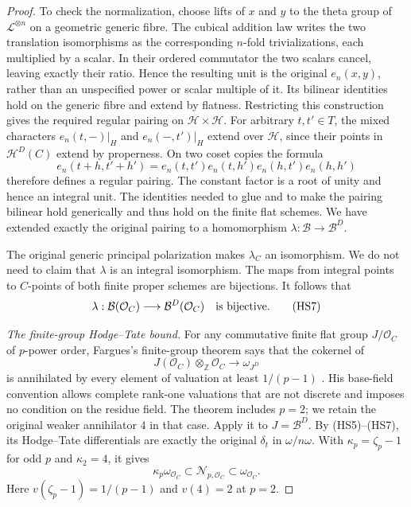 \begin{proof}
To check the normalization, choose lifts of $x$ and $y$ to the
theta group of $\mathcal L^{\otimes n}$ on a geometric generic
fibre. The cubical addition law writes the two translation
isomorphisms as the corresponding $n$-fold trivializations,
each multiplied by a scalar. In their ordered commutator the two
scalars cancel, leaving exactly their ratio. Hence the resulting
unit is the original $e_n(x,y)$, rather than an unspecified power
or scalar multiple of it. Its bilinear identities hold on the
generic fibre and extend by flatness. Restricting this construction
gives the required regular pairing on
$\mathcal H\times\mathcal H$\cite{hodge-specialization-source}.
For arbitrary $t,t'\in T$,
the mixed characters $e_n(t,-)|_H$ and $e_n(-,t')|_H$ extend over
$\mathcal H$, since their points in $\mathcal H^D(C)$ extend by
properness. On two coset copies the formula
\[
 e_n(t+h,t'+h')
   =e_n(t,t')e_n(t,h')e_n(h,t')e_n(h,h')
 \tag{HS6}
\]
therefore defines a regular pairing. The constant factor is a
root of unity and hence an integral unit. The identities needed
to glue and to make the pairing bilinear hold generically and
thus hold on the finite flat schemes. We have extended exactly
the original pairing to a homomorphism
$\lambda:\mathcal B\to\mathcal B^D$.

The original generic principal polarization makes $\lambda_C$
an isomorphism. We do not need to claim that $\lambda$ is an
integral isomorphism. The maps from integral points to $C$-points
of both finite proper schemes are bijections. It follows that
\[
 \lambda:\mathcal B(\mathcal O_C)
                       \longrightarrow\mathcal B^D(\mathcal O_C)
 \quad\hbox{is bijective}.
 \tag{HS7}
\]

\emph{The finite-group Hodge--Tate bound.}
For any commutative finite flat group $J/\mathcal O_C$ of $p$-power
order, Fargues's finite-group theorem says that the cokernel of
\[
 J(\mathcal O_C)\otimes_{\mathbb Z}\mathcal O_C
       \longrightarrow\omega_{J^D}
\]
is annihilated by every element of valuation at least $1/(p-1)$
\cite[\S5.4, Theorem~3]{hodge-fargues-finite}. His base-field
convention allows complete rank-one valuations that are not discrete
and imposes no condition on the residue field. The theorem includes
$p=2$; we retain the original weaker annihilator $4$ in that case.
Apply it to $J=\mathcal B^D$. By \textup{(HS5)--(HS7)}, its
Hodge--Tate differentials are exactly the original $\delta_t$ in
$\omega/n\omega$. With
$\kappa_p=\zeta_p-1$ for odd $p$ and $\kappa_2=4$, it gives
\[
 \kappa_p\omega_{\mathcal O_C}
             \subset\mathcal N_{p,\mathcal O_C}
             \subset\omega_{\mathcal O_C}.
 \tag{HS8}
\]
Here $v(\zeta_p-1)=1/(p-1)$ and $v(4)=2$ at $p=2$.


\end{proof}
